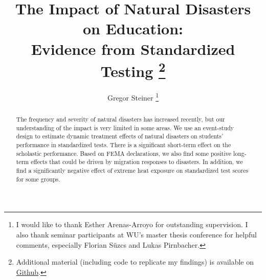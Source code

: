 \documentclass[11pt]{article}
\title{The Impact of Natural Disasters on Education: \\ Evidence from Standardized Testing \thanks{Additional material (including code to replicate my findings) is available on \href{https://github.com/gregorsteiner/MasterThesis}{Github}.}}
\author{Gregor Steiner \thanks{I would like to thank Esther Arenas-Arroyo for outstanding supervision. I also thank seminar participants at WU's master thesis conference for helpful comments, especially Florian Süzcs and Lukas Pirnbacher.}}
\begin{document}
\maketitle
{}

\begin{abstract}
	\centering
	\begin{minipage}{\dimexpr\paperwidth-10cm}
		The frequency and severity of natural disasters has increased recently, but our understanding of the impact is very limited in some areas. We use an event-study design to estimate dynamic treatment effects of natural disasters on students' performance in standardized tests. There is a significant short-term effect on the scholastic performance. Based on FEMA declarations, we also find some positive long-term effects that could be driven by migration responses to disasters. In addition, we find a significantly negative effect of extreme heat exposure on standardized test scores for some groups.
	\end{minipage}
\end{abstract}

\newpage
\tableofcontents

\newpage












\appendix





\end{document}
